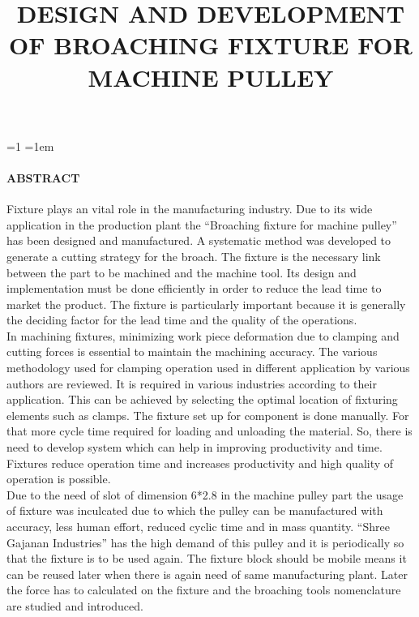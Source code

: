 \documentclass[16pt,a4paper]{article}
\begin{document}
\tableofcontents

\clearpage
\pagebreak

\listoffigures

\pagebreak

\listoftables

\title{DESIGN AND DEVELOPMENT OF BROACHING FIXTURE FOR MACHINE PULLEY}
\maketitle
\linespread={1}
\parskip=1em

\paragraph{ABSTRACT\\}
Fixture plays an vital role in the manufacturing industry. Due to its wide application in the production plant the “Broaching fixture for machine pulley” has been designed and manufactured.  A systematic method was developed to generate a cutting strategy for the broach. The fixture is the necessary link between the part to be machined and the machine tool. Its design and implementation must be done efficiently in order to reduce the lead time to market the product. The fixture is particularly important because it is generally the deciding factor for the lead time and the quality of the operations. 
\\In machining fixtures, minimizing work piece deformation due to clamping and cutting forces is essential to maintain the machining accuracy. The various methodology used for clamping operation used in different application by various authors are reviewed. It is required in various industries according to their application. This can be achieved by selecting the optimal location of fixturing elements such as clamps. The fixture set up for component is done manually. For that more cycle time required for loading and unloading the material. So, there is need to develop system which can help in improving productivity and time. Fixtures reduce operation time and increases productivity and high quality of operation is possible.
\\ Due to the need of slot of dimension 6*2.8 in the machine pulley part the usage of fixture was inculcated due to which the pulley can be manufactured with accuracy, less human effort, reduced cyclic time and in mass quantity. “Shree Gajanan Industries” has the high demand of this pulley and it is periodically so that the fixture is to be used again. The fixture block should be mobile means it can be reused later when there is again need of same manufacturing plant. Later the force has to calculated on the fixture and the broaching tools nomenclature are studied and introduced.
\end{document}
